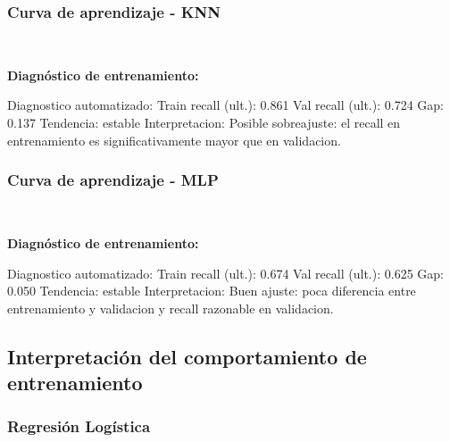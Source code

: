 \documentclass[11pt]{article}
\begin{document}
    
    \subsubsection{Curva de aprendizaje -
KNN}\label{curva-de-aprendizaje---knn}

    
    \begin{center}
    \end{center}
    { \hspace*{\fill} \\}
    
    \textbf{Diagnóstico de entrenamiento:}

Diagnostico automatizado: Train recall (ult.): 0.861 \textbar{} Val
recall (ult.): 0.724 \textbar{} Gap: 0.137 \textbar{} Tendencia: estable
Interpretacion: Posible sobreajuste: el recall en entrenamiento es
significativamente mayor que en validacion.

    
    \subsubsection{Curva de aprendizaje -
MLP}\label{curva-de-aprendizaje---mlp}

    
    \begin{center}
    \end{center}
    { \hspace*{\fill} \\}
    
    \textbf{Diagnóstico de entrenamiento:}

Diagnostico automatizado: Train recall (ult.): 0.674 \textbar{} Val
recall (ult.): 0.625 \textbar{} Gap: 0.050 \textbar{} Tendencia: estable
Interpretacion: Buen ajuste: poca diferencia entre entrenamiento y
validacion y recall razonable en validacion.

    
    \subsection{Interpretación del comportamiento de
entrenamiento}\label{interpretaciuxf3n-del-comportamiento-de-entrenamiento}

\subsubsection{Regresión Logística}\label{regresiuxf3n-loguxedstica}
\end{document}
